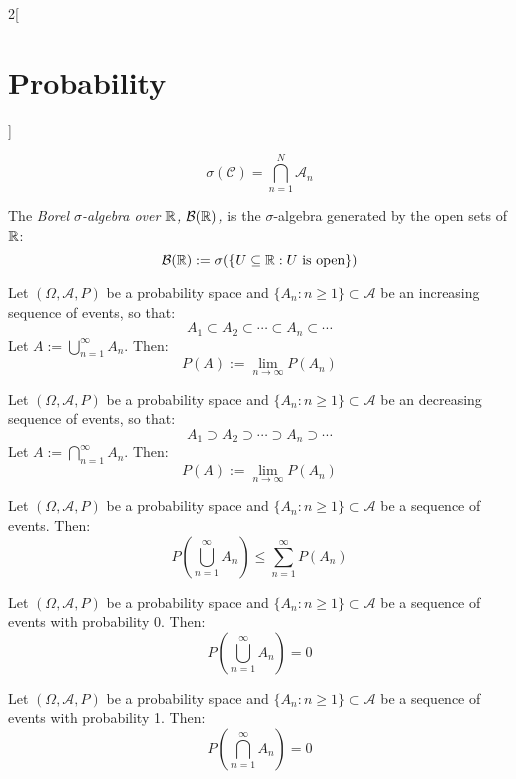 \documentclass[../../../main.tex]{subfiles}
\begin{document}
\begin{multicols}{2}[\section{Probability}]
\begin{definition}
    $$\sigma(\mathcal{C})=\bigcap_{n=1}^N\mathcal{A}_n$$
  \end{definition}
  \begin{definition}
    The \textit{Borel $\sigma$-algebra over $\mathbb{R}$, $\mathcal{B}(\mathbb{R})$,} is the $\sigma$-algebra generated by the open sets of $\mathbb{R}$: $$\mathcal{B}(\mathbb{R}):=\sigma(\{U\subseteq\mathbb{R}:U\text{ is open}\})$$
  \end{definition}
  \begin{theorem}
    Let $(\Omega,\mathcal{A},P)$ be a probability space and $\{A_n:n\geq 1\}\subset\mathcal{A}$ be an increasing sequence of events, so that: $$A_1\subset A_2\subset\cdots\subset A_n\subset\cdots$$ Let $A:=\bigcup_{n=1}^\infty A_n$. Then: $$P(A):=\lim_{n\to\infty}P(A_n)$$
  \end{theorem}
  \begin{corollary}
    Let $(\Omega,\mathcal{A},P)$ be a probability space and $\{A_n:n\geq 1\}\subset\mathcal{A}$ be an decreasing sequence of events, so that: $$A_1\supset A_2\supset\cdots\supset A_n\supset\cdots$$ Let $A:=\bigcap_{n=1}^\infty A_n$. Then: $$P(A):=\lim_{n\to\infty}P(A_n)$$
  \end{corollary}
  \begin{prop}
    Let $(\Omega,\mathcal{A},P)$ be a probability space and $\{A_n:n\geq 1\}\subset\mathcal{A}$ be a sequence of events. Then: $$P\left(\bigcup_{n=1}^\infty A_n\right)\leq\sum_{n=1}^\infty P(A_n)$$
  \end{prop}
  \begin{corollary}
    Let $(\Omega,\mathcal{A},P)$ be a probability space and $\{A_n:n\geq 1\}\subset\mathcal{A}$ be a sequence of events with probability 0. Then: $$P\left(\bigcup_{n=1}^\infty A_n\right)=0$$
  \end{corollary}
  \begin{corollary}
    Let $(\Omega,\mathcal{A},P)$ be a probability space and $\{A_n:n\geq 1\}\subset\mathcal{A}$ be a sequence of events with probability 1. Then: $$P\left(\bigcap_{n=1}^\infty A_n\right)=0$$
  \end{corollary}

\end{multicols}
\end{document}
